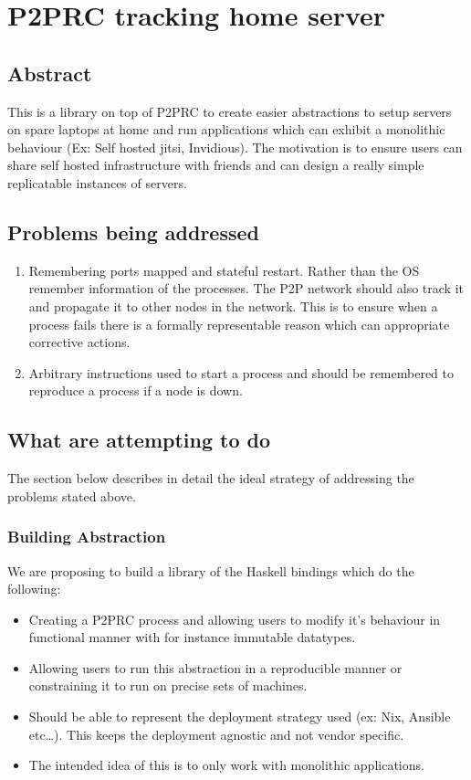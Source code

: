 \documentclass[11pt]{article}
\author{Akilan}
\date{\today}
\title{}
\begin{document}
\tableofcontents

\section{P2PRC tracking home server}
\label{sec:org5106d20}
\subsection{Abstract}
\label{sec:org119e303}
This is a library on top of P2PRC to create easier abstractions
to setup servers on spare laptops at home and run applications
which can exhibit a monolithic behaviour (Ex: Self hosted
jitsi, Invidious). The motivation is to ensure users can
share self hosted infrastructure with friends and can design
a really simple replicatable instances of servers.

\subsection{Problems being addressed}
\label{sec:orgb2d89d0}
\begin{enumerate}
\item Remembering ports mapped and stateful restart. Rather than the OS remember
information of the processes. The P2P network should also track it and
propagate it to other nodes in the network. This is to ensure when a process
fails there is a formally representable reason which can appropriate corrective
actions.
\item Arbitrary instructions used to start a process and should be remembered to reproduce a
process if a node is down.
\end{enumerate}


\subsection{What are attempting to do}
\label{sec:org0f074f0}
The section below describes in detail the ideal strategy of addressing the problems stated
above.

\subsubsection{Building Abstraction}
\label{sec:orgaee85d9}
We are proposing to build a library of the Haskell bindings which do the following:
\begin{itemize}
\item Creating a P2PRC process and allowing users to modify it's behaviour in functional manner with for instance
immutable datatypes.
\item Allowing users to run this abstraction in a reproducible manner or constraining it to run on precise
sets of machines.
\item Should be able to represent the deployment strategy used (ex: Nix, Ansible etc\ldots{}). This keeps the
deployment agnostic and not vendor specific.
\item The intended idea of this is to only work with monolithic applications.
\end{itemize}
\end{document}
